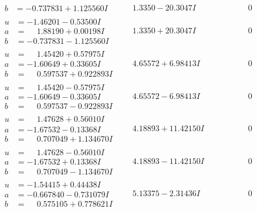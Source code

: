 \documentclass[1p]{elsarticle_modified}
\theoremstyle{definition}
\begin{document}
$$\begin{array}{c|c|c}
\begin{aligned}
b &= -0.737831 + 1.125560 I\end{aligned}
 & \phantom{-}1.3350 - 20.3047 I & \phantom{-0.000000 } 0 \\ \hline\begin{aligned}
u &= -1.46201 - 0.53500 I \\
a &= \phantom{-}1.88190 + 0.00198 I \\
b &= -0.737831 - 1.125560 I\end{aligned}
 & \phantom{-}1.3350 + 20.3047 I & \phantom{-0.000000 } 0 \\ \hline\begin{aligned}
u &= \phantom{-}1.45420 + 0.57975 I \\
a &= -1.60649 + 0.33605 I \\
b &= \phantom{-}0.597537 + 0.922893 I\end{aligned}
 & \phantom{-}4.65572 + 6.98413 I & \phantom{-0.000000 } 0 \\ \hline\begin{aligned}
u &= \phantom{-}1.45420 - 0.57975 I \\
a &= -1.60649 - 0.33605 I \\
b &= \phantom{-}0.597537 - 0.922893 I\end{aligned}
 & \phantom{-}4.65572 - 6.98413 I & \phantom{-0.000000 } 0 \\ \hline\begin{aligned}
u &= \phantom{-}1.47628 + 0.56010 I \\
a &= -1.67532 - 0.13368 I \\
b &= \phantom{-}0.707049 + 1.134670 I\end{aligned}
 & \phantom{-}4.18893 + 11.42150 I & \phantom{-0.000000 } 0 \\ \hline\begin{aligned}
u &= \phantom{-}1.47628 - 0.56010 I \\
a &= -1.67532 + 0.13368 I \\
b &= \phantom{-}0.707049 - 1.134670 I\end{aligned}
 & \phantom{-}4.18893 - 11.42150 I & \phantom{-0.000000 } 0 \\ \hline\begin{aligned}
u &= -1.54415 + 0.44438 I \\
a &= -0.667840 - 0.731079 I \\
b &= \phantom{-}0.575105 + 0.778621 I\end{aligned}
 & \phantom{-}5.13375 - 2.31436 I & \phantom{-0.000000 } 0 \\ \hline\begin{aligned}

\end{aligned}
\end{array}$$
\end{document}
